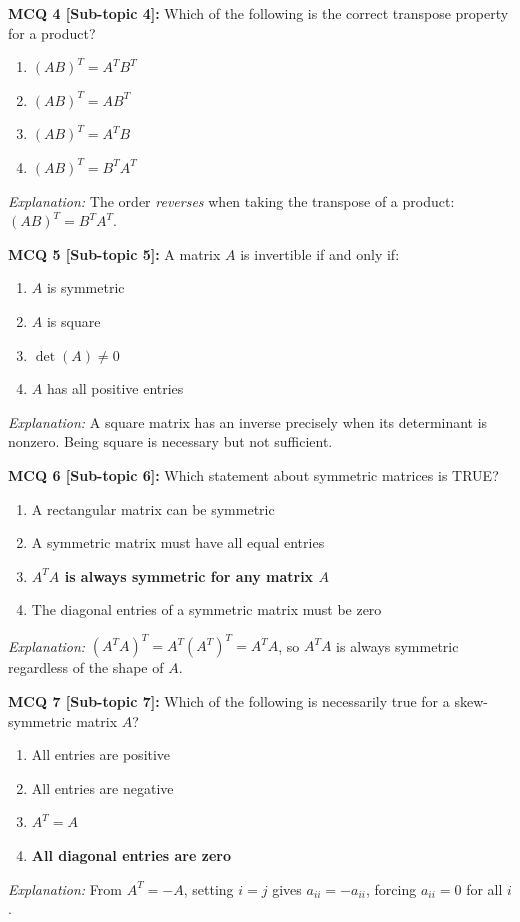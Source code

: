 \documentclass[12pt,a4paper]{article}
\begin{document}
\medskip
\textbf{MCQ 4 [Sub-topic 4]:} Which of the following is the correct transpose property for a product?
\begin{enumerate}[label=(\Alph*)]
  \item $(AB)^T = A^T B^T$
  \item $(AB)^T = A B^T$
  \item $(AB)^T = A^T B$
  \item \textbf{$(AB)^T = B^T A^T$}
\end{enumerate}
\textit{Explanation:} The order \emph{reverses} when taking the transpose of a product: $(AB)^T = B^T A^T$.

\medskip
\textbf{MCQ 5 [Sub-topic 5]:} A matrix $A$ is invertible if and only if:
\begin{enumerate}[label=(\Alph*)]
  \item $A$ is symmetric
  \item $A$ is square
  \item \textbf{$\det(A) \neq 0$}
  \item $A$ has all positive entries
\end{enumerate}
\textit{Explanation:} A square matrix has an inverse precisely when its determinant is nonzero. Being square is necessary but not sufficient.

\medskip
\textbf{MCQ 6 [Sub-topic 6]:} Which statement about symmetric matrices is TRUE?
\begin{enumerate}[label=(\Alph*)]
  \item A rectangular matrix can be symmetric
  \item A symmetric matrix must have all equal entries
  \item \textbf{$A^T A$ is always symmetric for any matrix $A$}
  \item The diagonal entries of a symmetric matrix must be zero
\end{enumerate}
\textit{Explanation:} $(A^T A)^T = A^T (A^T)^T = A^T A$, so $A^T A$ is always symmetric regardless of the shape of $A$.

\medskip
\textbf{MCQ 7 [Sub-topic 7]:} Which of the following is necessarily true for a skew-symmetric matrix $A$?
\begin{enumerate}[label=(\Alph*)]
  \item All entries are positive
  \item All entries are negative
  \item $A^T = A$
  \item \textbf{All diagonal entries are zero}
\end{enumerate}
\textit{Explanation:} From $A^T = -A$, setting $i = j$ gives $a_{ii} = -a_{ii}$, forcing $a_{ii} = 0$ for all $i$.
\end{document}
